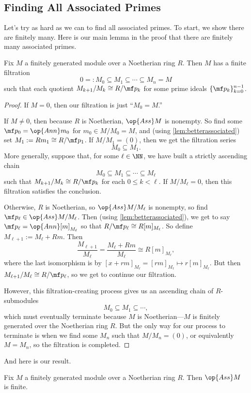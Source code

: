 \subsection{Finding All Associated Primes}
Let's try as hard as we can to find all associated primes. To start, we show there are finitely many. Here is our main lemma in the proof that there are finitely many associated primes.
\begin{lemma} \label{lem:fingenfiltration}
	Fix $M$ a finitely generated module over a Noetherian ring $R$. Then $M$ has a finite filtration
	\[0=:M_0\subseteq M_1\subseteq\cdots\subseteq M_n=M\]
	such that each quotient $M_{k+1}/M_k\cong R/\mf p_k$ for some prime ideals $\{\mf p_k\}_{k=0}^{n-1}$.
\end{lemma}
\begin{proof}
	If $M=0$, then our filtration is just ``$M_0=M$.''
	
	If $M\ne0$, then because $R$ is Noetherian, $\op{Ass}M$ is nonempty. So find some $\mf p_0=\op{Ann}m_0$ for $m_0\in M/M_0=M$, and (using \autoref{lem:betterassociated}) set $M_1:=Rm_1\cong R/\mf p_1$. If $M/M_1=(0)$, then we get the filtration series
	\[M_0\subseteq M_1.\]
	More generally, suppose that, for some $\ell\in\NN$, we have built a strictly ascending chain
	\[M_0\subseteq M_1\subseteq\cdots\subseteq M_\ell\]
	such that $M_{k+1}/M_k\cong R/\mf p_k$ for each $0\le k<\ell$. If $M/M_\ell=0$, then this filtration satisfies the conclusion.
	
	Otherwise, $R$ is Noetherian, so $\op{Ass}M/M_\ell$ is nonempty, so find $\mf p_\ell\in\op{Ass}M/M_\ell$. Then (using \autoref{lem:betterassociated}), we get to say $\mf p_\ell=\op{Ann}[m]_{M_\ell}$ so that $R/\mf p_\ell\cong R[m]_{M_\ell}$. So define $M_{\ell+1}:=M_\ell+Rm$. Then
	\[\frac{M_{\ell+1}}{M_\ell}=\frac{M_\ell+Rm}{M_\ell}\cong R[m]_{M_\ell},\]
	where the last isomorphism is by $[x+rm]_{M_\ell}=[rm]_{M_\ell}\mapsto r[m]_{M_{\ell}}$. But then $M_{\ell+1}/M_\ell\cong R/\mf p_\ell$, so we get to continue our filtration.
	
	However, this filtration-creating process gives us an ascending chain of $R$-submodules
	\[M_0\subseteq M_1\subseteq\cdots,\]
	which must eventually terminate because $M$ is Noetherian---$M$ is finitely generated over the Noetherian ring $R$. But the only way for our process to terminate is when we find some $M_n$ such that $M/M_n=(0)$, or equivalently $M=M_n$, so the filtration is completed.
\end{proof}
And here is our result.
\begin{theorem} \label{thm:finass}
	Fix $M$ a finitely generated module over a Noetherian ring $R$. Then $\op{Ass}M$ is finite.
\end{theorem}
